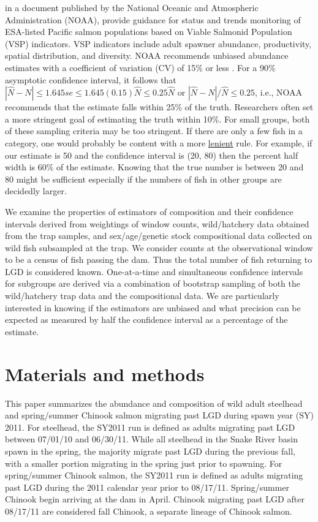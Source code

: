 \documentclass[%
                leqno,         %
%
]{nrc1}                          %
\begin{document}
\citet{McElhany2000} in a document published by the National Oceanic and Atmospheric Administration (NOAA), provide guidance for status and trends monitoring of ESA-listed Pacific salmon populations based on Viable Salmonid Population (VSP) indicators. VSP indicators include adult spawner abundance, productivity, spatial distribution, and diversity. NOAA recommends unbiased abundance estimates with a coefficient of variation (CV) of 15\% or less \citep{Crawford2011}. For a 90\% asymptotic confidence interval, it follows that $ |\hat{N}-N|\le 1.645se\le 1.645(0.15)\hat{N}\le 0.25\hat{N}$ or $ |\hat{N}-N|/\hat{N}\le 0.25$, i.e., NOAA recommends that the estimate falls within 25\% of the truth. Researchers often set a more stringent goal of estimating the truth within 10\%.  For small groups, both of these sampling criteria may be too stringent.  If there are only a few fish in a category, one would probably be content with a more \underline{lenient} rule. For example, if our estimate is 50 and the confidence interval is (20, 80) then the percent half width is 60\% of the estimate. Knowing that the true number is between 20 and 80 might be sufficient especially if the numbers of fish in other groups are decidedly larger.

We examine the properties of estimators of composition and their confidence intervals derived from weightings of window counts, wild/hatchery data obtained from the trap samples, and sex/age/genetic stock compositional data collected on wild fish subsampled at the trap. We consider counts at the observational window to be a census of fish passing the dam. Thus the total number of fish returning to LGD is considered known.  One-at-a-time and simultaneous confidence intervals for subgroups are derived via a combination of bootstrap sampling of both the wild/hatchery trap data and the compositional data.  We are particularly interested in knowing if the estimators are unbiased and what precision can be expected as measured by half the confidence interval as a percentage of the estimate.

\section*{Materials and methods}
This paper summarizes the abundance and composition of wild adult steelhead and spring/summer Chinook salmon migrating past LGD during spawn year (SY) 2011. For steelhead, the SY2011 run is defined as adults migrating past LGD between 07/01/10 and 06/30/11. While all steelhead in the Snake River basin spawn in the spring, the majority migrate past LGD during the previous fall, with a smaller portion migrating in the spring just prior to spawning. For spring/summer Chinook salmon, the SY2011 run is defined as adults migrating past LGD during the 2011 calendar year prior to 08/17/11. Spring/summer Chinook begin arriving at the dam in April. Chinook migrating past LGD after 08/17/11 are considered fall Chinook, a separate lineage of Chinook salmon.
\end{document}
